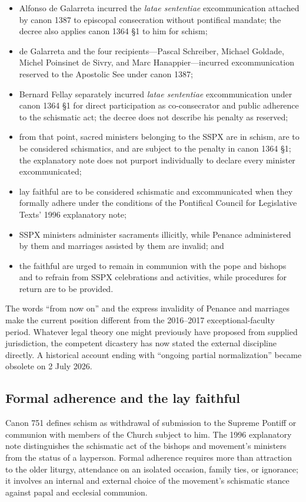 \begin{itemize}
\item Alfonso de Galarreta incurred the \emph{latae sententiae} excommunication attached by canon 1387 to episcopal consecration without pontifical mandate; the decree also applies canon 1364 \S1 to him for schism;
\item de Galarreta and the four recipients---Pascal Schreiber, Michael Goldade, Michel Poinsinet de Sivry, and Marc Hanappier---incurred excommunication reserved to the Apostolic See under canon 1387;
\item Bernard Fellay separately incurred \emph{latae sententiae} excommunication under canon 1364 \S1 for direct participation as co-consecrator and public adherence to the schismatic act; the decree does not describe his penalty as reserved;
\item from that point, sacred ministers belonging to the SSPX are in schism, are to be considered schismatics, and are subject to the penalty in canon 1364 \S1; the explanatory note does not purport individually to declare every minister excommunicated;
\item lay faithful are to be considered schismatic and excommunicated when they formally adhere under the conditions of the Pontifical Council for Legislative Texts' 1996 explanatory note;
\item SSPX ministers administer sacraments illicitly, while Penance administered by them and marriages assisted by them are invalid; and
\item the faithful are urged to remain in communion with the pope and bishops and to refrain from SSPX celebrations and activities, while procedures for return are to be provided.
\end{itemize}

The words “from now on” and the express invalidity of Penance and marriages make the current position different from the 2016--2017 exceptional-faculty period. Whatever legal theory one might previously have proposed from supplied jurisdiction, the competent dicastery has now stated the external discipline directly. A historical account ending with “ongoing partial normalization” became obsolete on 2 July 2026.

\subsection{Formal adherence and the lay faithful}

Canon 751 defines schism as withdrawal of submission to the Supreme Pontiff or communion with members of the Church subject to him. The 1996 explanatory note distinguishes the schismatic act of the bishops and movement's ministers from the status of a layperson. Formal adherence requires more than attraction to the older liturgy, attendance on an isolated occasion, family ties, or ignorance; it involves an internal and external choice of the movement's schismatic stance against papal and ecclesial communion.


